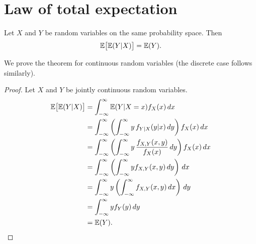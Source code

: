
\section{Law of total expectation}

\begin{theorem}
Let $X$ and $Y$ be random variables on the same probability space. Then
\[
\mathbb{E}\big[\mathbb{E}(Y|X)\big] = \mathbb{E}(Y).
\]
\end{theorem}
We prove the theorem for continuous random variables (the discrete case follows similarly).
\begin{proof}
Let $X$ and $Y$ be jointly continuous random variables.%
\begin{align*}
\mathbb{E}\big[\mathbb{E}(Y|X)\big] 
	& = \int_{-\infty}^{\infty} \mathbb{E}(Y|X=x) f_X(x)\,dx \\
	& = \int_{-\infty}^{\infty}\left(\int_{-\infty}^{\infty} y\,f_{Y|X}(y|x)\,dy\right) f_X(x)\,dx \\
	& = \int_{-\infty}^{\infty}\left(\int_{-\infty}^{\infty} y\,\frac{f_{X,Y}(x,y)}{f_X(x)}\,dy\right) f_X(x)\,dx \\
	& = \int_{-\infty}^{\infty}\left(\int_{-\infty}^{\infty} y f_{X,Y}(x,y)\,dy\right)\,dx \\
	& = \int_{-\infty}^{\infty} y \left(\int_{-\infty}^{\infty} f_{X,Y}(x,y)\,dx\right)\,dy \\
	& = \int_{-\infty}^{\infty} y f_Y(y) \,dy \\
	& = \mathbb{E}(Y).
\end{align*}
\end{proof}


